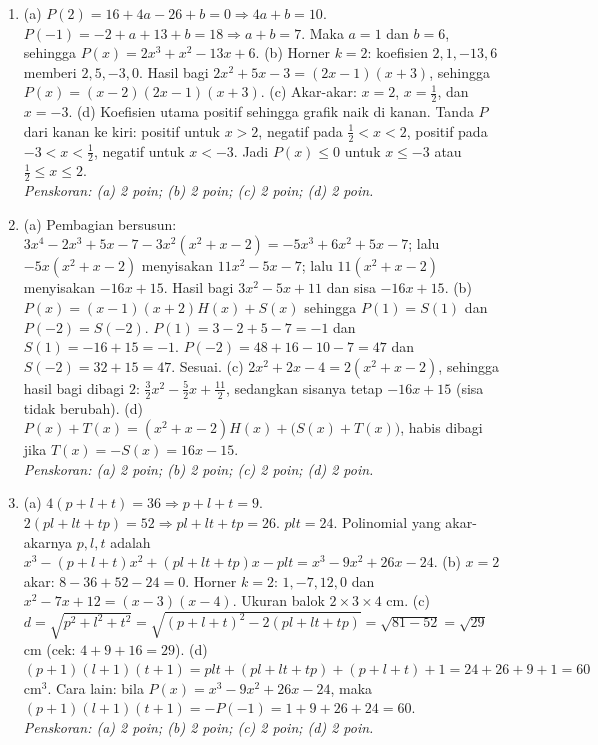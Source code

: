 \documentclass[a4paper,11pt]{article}
\newcounter{no}
\begin{document}
\par{}\par\vspace{0.2em}
\small\begin{enumerate}[leftmargin=2em,itemsep=3pt,topsep=2pt]
\item[\textbf{1.}] (a) $P(2)=16+4a-26+b=0\Rightarrow4a+b=10$. $P(-1)=-2+a+13+b=18\Rightarrow a+b=7$. Maka $a=1$ dan $b=6$, sehingga $P(x)=2x^3+x^2-13x+6$. (b) Horner $k=2$: koefisien $2,1,-13,6$ memberi $2,5,-3,0$. Hasil bagi $2x^2+5x-3=(2x-1)(x+3)$, sehingga $P(x)=(x-2)(2x-1)(x+3)$. (c) Akar-akar: $x=2$, $x=\frac12$, dan $x=-3$. (d) Koefisien utama positif sehingga grafik naik di kanan. Tanda $P$ dari kanan ke kiri: positif untuk $x>2$, negatif pada $\frac12<x<2$, positif pada $-3<x<\frac12$, negatif untuk $x<-3$. Jadi $P(x)\le0$ untuk $x\le-3$ atau $\frac12\le x\le2$. \\ \textit{Penskoran: (a) 2 poin; (b) 2 poin; (c) 2 poin; (d) 2 poin.}
\item[\textbf{2.}] (a) Pembagian bersusun: $3x^4-2x^3+5x-7-3x^2(x^2+x-2)=-5x^3+6x^2+5x-7$; lalu $-5x(x^2+x-2)$ menyisakan $11x^2-5x-7$; lalu $11(x^2+x-2)$ menyisakan $-16x+15$. Hasil bagi $3x^2-5x+11$ dan sisa $-16x+15$. (b) $P(x)=(x-1)(x+2)H(x)+S(x)$ sehingga $P(1)=S(1)$ dan $P(-2)=S(-2)$. $P(1)=3-2+5-7=-1$ dan $S(1)=-16+15=-1$. $P(-2)=48+16-10-7=47$ dan $S(-2)=32+15=47$. Sesuai. (c) $2x^2+2x-4=2(x^2+x-2)$, sehingga hasil bagi dibagi $2$: $\frac32x^2-\frac52x+\frac{11}2$, sedangkan sisanya tetap $-16x+15$ (sisa tidak berubah). (d) $P(x)+T(x)=(x^2+x-2)H(x)+\big(S(x)+T(x)\big)$, habis dibagi jika $T(x)=-S(x)=16x-15$. \\ \textit{Penskoran: (a) 2 poin; (b) 2 poin; (c) 2 poin; (d) 2 poin.}
\item[\textbf{3.}] (a) $4(p+l+t)=36\Rightarrow p+l+t=9$. $2(pl+lt+tp)=52\Rightarrow pl+lt+tp=26$. $plt=24$. Polinomial yang akar-akarnya $p,l,t$ adalah $x^3-(p+l+t)x^2+(pl+lt+tp)x-plt=x^3-9x^2+26x-24$. (b) $x=2$ akar: $8-36+52-24=0$. Horner $k=2$: $1,-7,12,0$ dan $x^2-7x+12=(x-3)(x-4)$. Ukuran balok $2\times3\times4$ cm. (c) $d=\sqrt{p^2+l^2+t^2}=\sqrt{(p+l+t)^2-2(pl+lt+tp)}=\sqrt{81-52}=\sqrt{29}$ cm (cek: $4+9+16=29$). (d) $(p+1)(l+1)(t+1)=plt+(pl+lt+tp)+(p+l+t)+1=24+26+9+1=60$ cm$^3$. Cara lain: bila $P(x)=x^3-9x^2+26x-24$, maka $(p+1)(l+1)(t+1)=-P(-1)=1+9+26+24=60$. \\ \textit{Penskoran: (a) 2 poin; (b) 2 poin; (c) 2 poin; (d) 2 poin.}

\end{enumerate}
\end{document}
